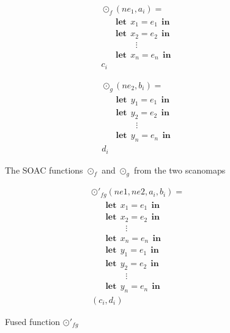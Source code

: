 \documentclass[11pt,bibliography=totocnumbered]{article}
\newcommand\lett{\phantom{-}\:\:\mathbf{let}\:\:}
\newcommand\inn{\:\:\mathbf{in}\:\:}
\begin{document}
 \begin{figure}[hb!]

   \begin{mdframed}
 \begin{minipage}{0.5\linewidth}
     \centering

       \begin{align*}
       &\odot_f(ne_1, a_i) = \\
       &\lett x_1 = e_1 \inn\\
       &\lett x_2 = e_2 \inn\\
       &\phantom{----}\vdots\\
       &\lett x_n = e_n \inn\\
       &c_i
       \end{align*}

     \label{fig:mapf}
 \end{minipage}
 \begin{minipage}{0.5\linewidth}
     \centering

     \begin{align*}
       &\odot_g(ne_2, b_i) = \\
       &\lett y_1 = e_1 \inn\\
       &\lett y_2 = e_2 \inn\\
       &\phantom{----}\vdots\\
       &\lett y_n = e_n \inn\\
       &d_i
     \end{align*}

     \label{fig:odotg}
   \end{minipage}

     \end{mdframed}
     \caption{The SOAC functions $\odot_f$ and $\odot_g$ from the two scanomaps}
     \label{fig:pre-fusion}
\end{figure}
\clearpage
\begin{figure}[hb!]

   \begin{mdframed}
     \centering

       \begin{align*}
       &\odot'_{fg}(ne1, ne2, a_i, b_i ) = \\
       &\lett x_1 = e_1 \inn\\
       &\lett x_2 = e_2 \inn\\
       &\phantom{----}\vdots\\
       &\lett x_n = e_n \inn\\
       &\lett y_1 = e_1 \inn\\
       &\lett y_2 = e_2 \inn\\
       &\phantom{----}\vdots\\
       &\lett y_n = e_n \inn\\
       &(c_i, d_i)
       \end{align*}
       \end{mdframed}
     \caption{Fused function $\odot'_{fg}$}
     \label{fig:post-fusion}
\end{figure}
\end{document}
